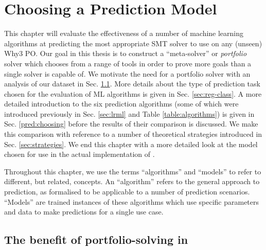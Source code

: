 \chapter{Choosing a Prediction Model}
\thispagestyle{nohead}
\label{Prediction}

This chapter will evaluate the effectiveness of a number of machine learning algorithms at predicting the most appropriate SMT solver to use on any (unseen) \textsf{Why3} PO.
Our goal in this thesis is to construct a ``meta-solver'' or \textit{portfolio} solver which chooses from a range of tools in order to prove more goals than a single solver is capable of.
We motivate the need for a portfolio solver with an analysis of our dataset 
in Sec. \ref{sec:portfolio-benefit}. 
More details about the type of prediction task chosen for the evaluation of ML algorithms is given in Sec. \ref{sec:reg-class}.
A more detailed introduction to the six prediction algorithms (some of which were introduced previously in Sec. \ref{sec:lrml} and Table \ref{table:algorithms}) is given in Sec. \ref{pred:choosing} before the results of their comparison is discussed. 
We make this comparison with reference to a number of theoretical strategies introduced in Sec. \ref{sec:strategies}.
We end this chapter with a more detailed look at the model chosen for use in the actual implementation of \where.

Throughout this chapter, we use the terms ``algorithms'' and ``models'' to refer to different, but related, concepts. An ``algorithm'' refers to the general approach to prediction, as formalised to be applicable to a number of prediction scenarios.
``Models'' are trained instances of these algorithms which use specific parameters and data to make predictions for a single use case.

\section{The benefit of portfolio-solving in \why}
\label{sec:portfolio-benefit}

